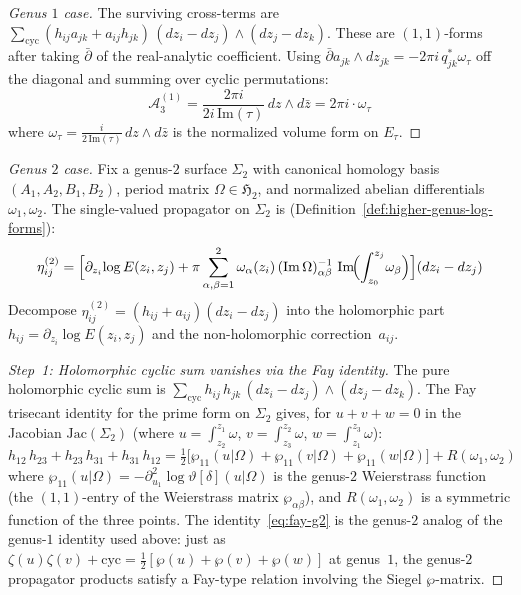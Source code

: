 \begin{proof}[Genus $1$ case]
The surviving cross-terms are $\sum_{\mathrm{cyc}} (h_{ij} a_{jk} + a_{ij} h_{jk})\,(dz_i - dz_j) \wedge (dz_j - dz_k)$. These are $(1,1)$-forms after taking $\bar\partial$ of the real-analytic coefficient. Using
$\bar\partial a_{jk}\wedge dz_{jk}=-2\pi i\,q_{jk}^{*}\omega_\tau$
off the diagonal and summing over cyclic permutations:
\begin{equation}
\mathcal{A}_3^{(1)} = \frac{2\pi i}{2i\,\mathrm{Im}(\tau)} \, dz \wedge d\bar{z} = 2\pi i \cdot \omega_\tau
\end{equation}
where $\omega_\tau = \frac{i}{2\,\mathrm{Im}(\tau)}\,dz \wedge d\bar{z}$ is the normalized volume form on $E_\tau$.
\end{proof}

\begin{proof}[Genus $2$ case]
Fix a genus-$2$ surface $\Sigma_2$ with canonical homology basis
$(A_1, A_2, B_1, B_2)$, period matrix $\Omega \in \mathfrak{H}_2$,
and normalized abelian differentials $\omega_1, \omega_2$.
The single-valued propagator on $\Sigma_2$ is
(Definition~\ref{def:higher-genus-log-forms}):
\begin{equation}\label{eq:propagator-g2-full}
\eta_{ij}^{(2)} = \Bigl[\partial_{z_i}\!\log E(z_i, z_j)
 + \pi \sum_{\alpha,\beta=1}^{2}
 \omega_\alpha(z_i)\,(\operatorname{Im}\Omega)^{-1}_{\alpha\beta}\,
 \operatorname{Im}\!\Bigl(\int_{z_0}^{z_j}\!\omega_\beta\Bigr)
\Bigr](dz_i - dz_j)
\end{equation}
Decompose $\eta_{ij}^{(2)} = (h_{ij} + a_{ij})(dz_i - dz_j)$
into the holomorphic part
$h_{ij} = \partial_{z_i}\!\log E(z_i, z_j)$
and the non-holomorphic correction~$a_{ij}$.

\emph{Step~1: Holomorphic cyclic sum vanishes via the Fay identity.}
The pure holomorphic cyclic sum is
$\sum_{\mathrm{cyc}} h_{ij}\,h_{jk}\,(dz_i - dz_j) \wedge (dz_j - dz_k)$.
The Fay trisecant identity for the prime form on $\Sigma_2$ gives, for
$u + v + w = 0$ in the Jacobian $\mathrm{Jac}(\Sigma_2)$
(where $u = \int_{z_2}^{z_1}\!\omega$, $v = \int_{z_3}^{z_2}\!\omega$,
$w = \int_{z_1}^{z_3}\!\omega$):
\begin{equation}\label{eq:fay-g2-disabled}
h_{12}\,h_{23} + h_{23}\,h_{31} + h_{31}\,h_{12}
= \tfrac{1}{2}\bigl[\wp_{11}(u|\Omega) + \wp_{11}(v|\Omega)
 + \wp_{11}(w|\Omega)\bigr]
 + R(\omega_1, \omega_2)
\end{equation}
where $\wp_{11}(u|\Omega) = -\partial_{u_1}^2\!\log\vartheta[\delta](u|\Omega)$
is the genus-$2$ Weierstrass function (the $(1,1)$-entry of the
Weierstrass matrix $\wp_{\alpha\beta}$), and $R(\omega_1,\omega_2)$
is a symmetric function of the three points.
The identity~\eqref{eq:fay-g2} is the genus-$2$ analog
of the genus-$1$ identity used above: just as
$\zeta(u)\zeta(v) + \mathrm{cyc} = \frac{1}{2}[\wp(u) + \wp(v) + \wp(w)]$
at genus~$1$, the genus-$2$ propagator products satisfy a Fay-type
relation involving the Siegel $\wp$-matrix.


\end{proof}
